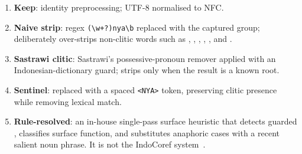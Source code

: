 
\begin{enumerate}
    \item \textbf{Keep}: identity preprocessing; UTF-8 normalised to NFC.
    \item \textbf{Naive strip}: regex \texttt{(\textbackslash w+?)nya\textbackslash b} replaced with the captured group; deliberately over-strips non-clitic words such as , , , , , and .
    \item \textbf{Sastrawi clitic}: Sastrawi's possessive-pronoun remover applied with an Indonesian-dictionary guard; strips  only when the result is a known root.
    \item \textbf{Sentinel}:  replaced with a spaced \texttt{<NYA>} token, preserving clitic presence while removing lexical match.
    \item \textbf{Rule-resolved}: an in-house single-pass surface heuristic that detects guarded , classifies surface function, and substitutes anaphoric cases with a recent salient noun phrase. It is not the IndoCoref system~\cite{artari2021indocoref}.
\end{enumerate}
